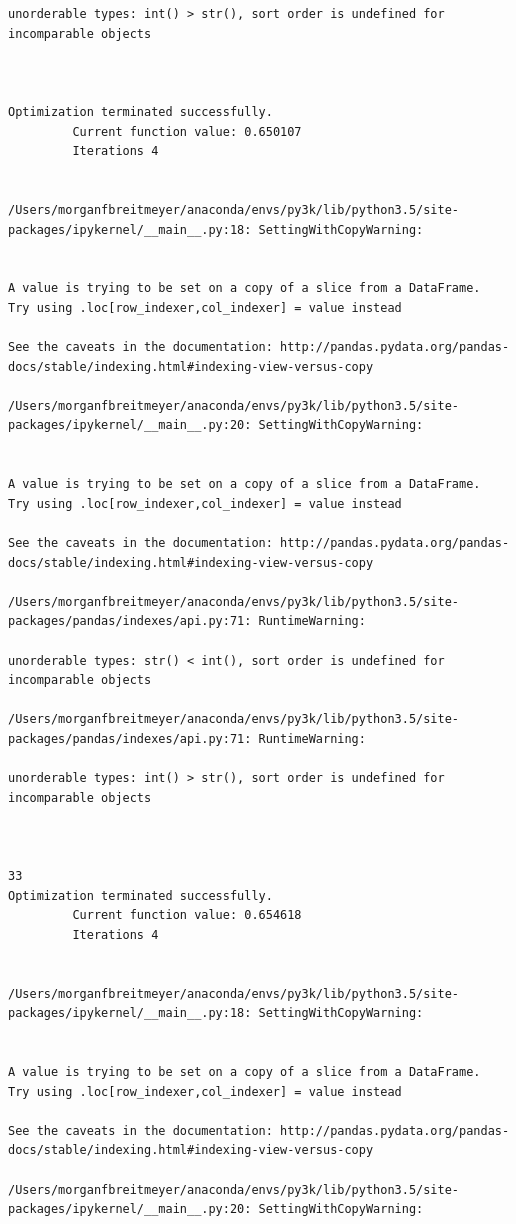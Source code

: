 \begin{lstlisting}
unorderable types: int() > str(), sort order is undefined for incomparable objects



Optimization terminated successfully.
         Current function value: 0.650107
         Iterations 4


/Users/morganfbreitmeyer/anaconda/envs/py3k/lib/python3.5/site-packages/ipykernel/__main__.py:18: SettingWithCopyWarning:


A value is trying to be set on a copy of a slice from a DataFrame.
Try using .loc[row_indexer,col_indexer] = value instead

See the caveats in the documentation: http://pandas.pydata.org/pandas-docs/stable/indexing.html#indexing-view-versus-copy

/Users/morganfbreitmeyer/anaconda/envs/py3k/lib/python3.5/site-packages/ipykernel/__main__.py:20: SettingWithCopyWarning:


A value is trying to be set on a copy of a slice from a DataFrame.
Try using .loc[row_indexer,col_indexer] = value instead

See the caveats in the documentation: http://pandas.pydata.org/pandas-docs/stable/indexing.html#indexing-view-versus-copy

/Users/morganfbreitmeyer/anaconda/envs/py3k/lib/python3.5/site-packages/pandas/indexes/api.py:71: RuntimeWarning:

unorderable types: str() < int(), sort order is undefined for incomparable objects

/Users/morganfbreitmeyer/anaconda/envs/py3k/lib/python3.5/site-packages/pandas/indexes/api.py:71: RuntimeWarning:

unorderable types: int() > str(), sort order is undefined for incomparable objects



33
Optimization terminated successfully.
         Current function value: 0.654618
         Iterations 4


/Users/morganfbreitmeyer/anaconda/envs/py3k/lib/python3.5/site-packages/ipykernel/__main__.py:18: SettingWithCopyWarning:


A value is trying to be set on a copy of a slice from a DataFrame.
Try using .loc[row_indexer,col_indexer] = value instead

See the caveats in the documentation: http://pandas.pydata.org/pandas-docs/stable/indexing.html#indexing-view-versus-copy

/Users/morganfbreitmeyer/anaconda/envs/py3k/lib/python3.5/site-packages/ipykernel/__main__.py:20: SettingWithCopyWarning:



\end{lstlisting}
